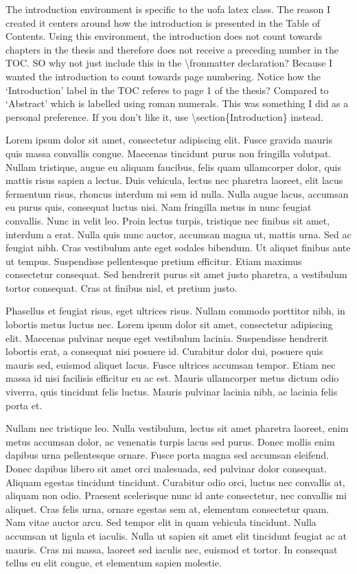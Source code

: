 \introduction

The introduction environment is specific to the uofa latex class. The reason I created it centers around how the introduction is presented in the Table of Contents. Using this environment, the introduction does not count towards chapters in the thesis and therefore does not receive a preceding number in the TOC. SO why not just include this in the \textbackslash fronmatter declaration? Because I wanted the introduction to count towards page numbering. Notice how the `Introduction' label in the TOC referes to page 1 of the thesis? Compared to `Abstract' which is labelled using roman numerals.
This was something I did as a personal preference. If you don't like it, use \textbackslash section\{Introduction\} instead.

Lorem ipsum dolor sit amet, consectetur adipiscing elit. Fusce gravida mauris quis massa convallis congue. Maecenas tincidunt purus non fringilla volutpat. Nullam tristique, augue eu aliquam faucibus, felis quam ullamcorper dolor, quis mattis risus sapien a lectus. Duis vehicula, lectus nec pharetra laoreet, elit lacus fermentum risus, rhoncus interdum mi sem id nulla. Nulla augue lacus, accumsan eu purus quis, consequat luctus nisi. Nam fringilla metus in nunc feugiat convallis. Nunc in velit leo. Proin lectus turpis, tristique nec finibus sit amet, interdum a erat. Nulla quis nunc auctor, accumsan magna ut, mattis urna. Sed ac feugiat nibh. Cras vestibulum ante eget sodales bibendum. Ut aliquet finibus ante ut tempus. Suspendisse pellentesque pretium efficitur. Etiam maximus consectetur consequat. Sed hendrerit purus sit amet justo pharetra, a vestibulum tortor consequat. Cras at finibus nisl, et pretium justo.

Phasellus et feugiat risus, eget ultrices risus. Nullam commodo porttitor nibh, in lobortis metus luctus nec. Lorem ipsum dolor sit amet, consectetur adipiscing elit. Maecenas pulvinar neque eget vestibulum lacinia. Suspendisse hendrerit lobortis erat, a consequat nisi posuere id. Curabitur dolor dui, posuere quis mauris sed, euismod aliquet lacus. Fusce ultrices accumsan tempor. Etiam nec massa id nisi facilisis efficitur eu ac est. Mauris ullamcorper metus dictum odio viverra, quis tincidunt felis luctus. Mauris pulvinar lacinia nibh, ac lacinia felis porta et.

Nullam nec tristique leo. Nulla vestibulum, lectus sit amet pharetra laoreet, enim metus accumsan dolor, ac venenatis turpis lacus sed purus. Donec mollis enim dapibus urna pellentesque ornare. Fusce porta magna sed accumsan eleifend. Donec dapibus libero sit amet orci malesuada, sed pulvinar dolor consequat. Aliquam egestas tincidunt tincidunt. Curabitur odio orci, luctus nec convallis at, aliquam non odio. Praesent scelerisque nunc id ante consectetur, nec convallis mi aliquet. Cras felis urna, ornare egestas sem at, elementum consectetur quam. Nam vitae auctor arcu. Sed tempor elit in quam vehicula tincidunt. Nulla accumsan ut ligula et iaculis. Nulla ut sapien sit amet elit tincidunt feugiat ac at mauris. Cras mi massa, laoreet sed iaculis nec, euismod et tortor. In consequat tellus eu elit congue, et elementum sapien molestie.


